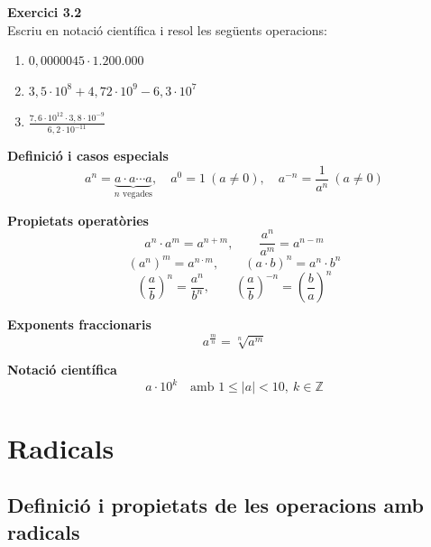 \documentclass[12pt]{article}
\begin{document}
\begin{exercici}
\textbf{Exercici 3.2}\\
Escriu en notació científica i resol les següents operacions:
\begin{enumerate}[label=\alph*)]
    \item $0{,}0000045 \cdot 1.200.000$
    \item $3{,}5 \cdot 10^8 + 4{,}72 \cdot 10^9 - 6{,}3 \cdot 10^7$
    \item $\frac{7{,}6 \cdot 10^{12} \cdot 3{,}8 \cdot 10^{-9}}{6{,}2 \cdot 10^{-11}}$
\end{enumerate}
\end{exercici}

\begin{resum}[title=Resum del Tema 3: Potències i Notació Científica]
\textbf{Definició i casos especials}
\[
a^n = \underbrace{a \cdot a \cdots a}_{n \text{ vegades}}, \quad
a^0 = 1 \ (a \neq 0), \quad
a^{-n} = \frac{1}{a^n} \ (a \neq 0)
\]

\textbf{Propietats operatòries}
\[
a^n \cdot a^m = a^{n+m}, \qquad \frac{a^n}{a^m} = a^{n-m}
\]
\[
(a^n)^m = a^{n \cdot m}, \qquad (a \cdot b)^n = a^n \cdot b^n
\]
\[
\left(\frac{a}{b}\right)^n = \frac{a^n}{b^n}, \qquad
\left(\frac{a}{b}\right)^{-n} = \left(\frac{b}{a}\right)^n
\]

\textbf{Exponents fraccionaris}
\[
a^{\frac{m}{n}} = \sqrt[n]{a^m}
\]

\textbf{Notació científica}
\[
a \cdot 10^k \quad \text{amb } 1 \le |a| < 10, \ k \in \mathbb{Z}
\]
\end{resum}

\newpage

\section{Radicals}

\subsection{Definició i propietats de les operacions amb radicals}
\end{document}
